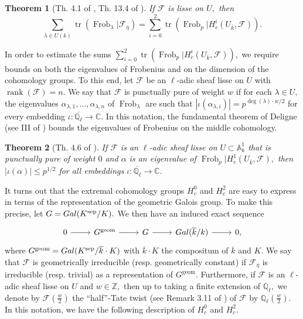 \documentclass[12pt]{amsart}
\newtheorem{theorem}{Theorem}[section]
\theoremstyle{definition}
\theoremstyle{remark}
\numberwithin{equation}{section}
\def\C{\mathbb C}
\def\A{\mathbb A}
\def\Gal{{\rm Gal}}
\def\Z{{\mathbb Z}}
\def\Q{{\mathbb Q}}
\def\C{\mathbb{C}}
\def\Z{\mathbb{Z}}
\def\Q{\mathbb{Q}}
\DeclareMathOperator{\Frob}{Frob}
\DeclareMathOperator{\tr}{tr}
\DeclareMathOperator{\rank}{rank}
\DeclareMathOperator{\geom}{geom}
\DeclareMathOperator{\sep}{sep}
\begin{document}
\begin{theorem}[Th. 4.1 of \cite{AppliedladicCohomology}, Th. 13.4 of \cite{ECMilneBook}]\label{GrothendieckLefschetz}
    If $\mathcal{F}$ is lisse on $U,$ then
    $$
    \sum\limits_{\lambda\in U(k)}\tr(\Frob_\lambda|\mathcal{F}_{\overline{\eta}}) = \sum\limits_{i=0}^2 \tr(\Frob_p|H_c^i(U_{\overline{k}},\mathcal{F})).
    $$
\end{theorem}

In order to estimate the sums $\sum\limits_{i=0}^2 \tr(\Frob_p|H_c^i(U_{\overline{k}},\mathcal{F})),$ we require bounds on both the eigenvalues of Frobenius and on the dimension of the cohomology groups. To this end, let $\mathcal{F}$ be an $\ell$-adic sheaf lisse on $U$ with $\rank(\mathcal{F})=n.$ We say that $\mathcal{F}$ is punctually pure of weight $w$ if for each $\lambda\in U,$ the eigenvalues $\alpha_{\lambda,1},\ldots,\alpha_{\lambda,n}$ of $\Frob_\lambda$ are such that $|\iota(\alpha_{\lambda,i})|=p^{\deg(\lambda)\cdot w/2}$ for every embedding $\iota:\overline{\Q_\ell}\to\C.$ In this notation, the fundamental theorem of Deligne (see III of \cite{WeilII}) bounds the eigenvalues of Frobenius on the middle cohomology.

\begin{theorem}[Th. 4.6 of \cite{AppliedladicCohomology}]\label{DelignePurity}
    If $\mathcal{F}$ is an $\ell$-adic sheaf lisse on $U\subset\A_{k}^1$ that is punctually pure of weight $0$  and $\alpha$ is an eigenvalue of $\Frob_p|H_c^1(U_{\overline{k}},\mathcal{F}),$ then $|\iota(\alpha)|\leq p^{1/2}$ for all embeddings $\iota:\overline{\Q_\ell}\to\C.$
\end{theorem}

It turns out that the extremal cohomology groups $H_c^0$ and $H_c^2$ are easy to express in terms of the representation of the geometric Galois group. To make this precise, let $G=\Gal(K^{\sep}/K).$ We then have an induced exact sequence
\begin{equation}\label{ArithGeoExactSequence}
\begin{tikzcd}
0 \arrow[r] & G^{\geom} \arrow[r] & G \arrow[r] & \Gal(\overline{k}/k) \arrow[r] & 0,
\end{tikzcd}
\end{equation}
where $G^{\geom} = \Gal(K^{\sep}/\overline{k}\cdot K)$ with $\overline{k}\cdot K$ the compositum of $\overline{k}$ and $K.$ We say that $\mathcal{F}$ is geometrically irreducible (resp. geometrically constant) if $\mathcal{F}_{\overline{\eta}}$ is irreducible (resp. trivial) as a representation of $G^{\geom}.$ Furthermore, if $\mathcal{F}$ is an $\ell$-adic sheaf lisse on $U$ and $w\in\Z,$ then up to taking a finite extension of $\Q_\ell,$ we denote by $\mathcal{F}(\frac{w}{2})$ the ``half''-Tate twist (see Remark 3.11 of \cite{AppliedladicCohomology}) of $\mathcal{F}$ by $\Q_\ell(\frac{w}{2}).$ In this notation, we have the following description of $H_c^0$ and $H_c^2.$
\end{document}
